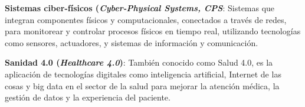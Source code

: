 










\textbf{Sistemas ciber-físicos (\textit{Cyber-Physical Systems, CPS}}: Sistemas que integran componentes físicos y computacionales, conectados a través de redes, para monitorear y controlar procesos físicos en tiempo real, utilizando tecnologías como sensores, actuadores, y sistemas de información y comunicación.

\textbf{Sanidad 4.0 (\textit{Healthcare 4.0})}: También conocido como Salud 4.0, es la aplicación de tecnologías digitales como inteligencia artificial, Internet de las cosas y big data en el sector de la salud para mejorar la atención médica, la gestión de datos y la experiencia del paciente.








